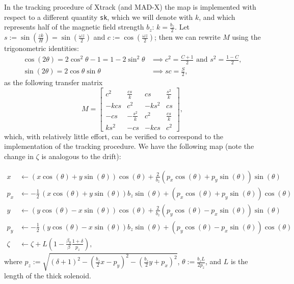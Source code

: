 In the tracking procedure of Xtrack (and MAD-X) the map is implemented with respect to a different quantity \verb|sk|, which we will denote with $k$, and which represents half of the magnetic field strength $b_z$: $k = \frac{b_z}{2}$.
Let $s := \sin(\frac{z k}{H}) = \sin(\frac{\omega z}{2})$ and $c := \cos(\frac{\omega z}{2})$; then we can rewrite $M$ using the trigonometric identities:
\begin{align*}
  \cos(2 \theta) = 2 \cos^2\theta - 1 = 1 - 2 \sin^2\theta &\implies c^2 = \frac{C + 1}{2} \text{ and } s^2 = \frac{1 - C}{2}, \\
  \sin(2 \theta) = 2 \cos\theta \sin\theta &\implies sc = \frac{S}{2},
\end{align*}
as the following transfer matrix
\[
  M = \begin{bmatrix}
    c^2 & \frac{cs}{k} & cs & \frac{s^2}{k} \\
    -kcs & c^2 & -ks^2 & cs \\
    -cs & -\frac{s^2}{k} & c^2 & \frac{cs}{k} \\
    ks^2 & -cs & -kcs & c^2
  \end{bmatrix},
\]
which, with relatively little effort, can be verified to correspond to the implementation of the tracking procedure.
We have the following map (note the change in $\zeta$ is analogous to the drift):

\begin{align*}
  x &\leftarrow {\left(x \cos\left(\theta\right) + y \sin\left(\theta\right)\right)} \cos\left(\theta\right) + \frac{2}{b_{z}} {\left(p_{x} \cos\left(\theta\right) + p_{y} \sin\left(\theta\right)\right)} \sin\left(\theta\right) \\
  p_x &\leftarrow -\frac{1}{2} \, {\left(x \cos\left(\theta\right) + y \sin\left(\theta\right)\right)} b_{z} \sin\left(\theta\right) + {\left(p_{x} \cos\left(\theta\right) + p_{y} \sin\left(\theta\right)\right)} \cos\left(\theta\right) \\
  y &\leftarrow {\left(y \cos\left(\theta\right) - x \sin\left(\theta\right)\right)} \cos\left(\theta\right) + \frac{2}{b_{z}} {\left(p_{y} \cos\left(\theta\right) - p_{x} \sin\left(\theta\right)\right)} \sin\left(\theta\right) \\
  p_y &\leftarrow -\frac{1}{2} \, {\left(y \cos\left(\theta\right) - x \sin\left(\theta\right)\right)} b_{z} \sin\left(\theta\right) + {\left(p_{y} \cos\left(\theta\right) - p_{x} \sin\left(\theta\right)\right)} \cos\left(\theta\right) \\
  \zeta &\leftarrow \zeta + L \left(1 - \frac{\beta_0}{\beta} \frac{1 + \delta}{p_z}\right),
\end{align*}
where $p_z :=  \sqrt{{\left(\delta + 1\right)}^2 - {\left(\frac{b_z}{2} x - p_{y}\right)}^{2} - {\left(\frac{b_{z}}{2} y + p_{x}\right)}^{2}}$, $\theta := \frac{b_{z} L}{2 p_z} $, and $L$ is the length of the thick solenoid.

